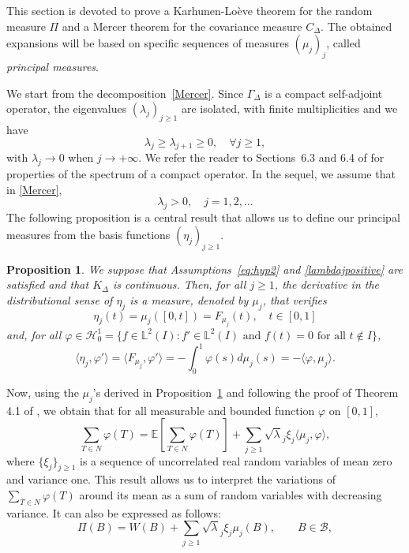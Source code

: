 \documentclass[aos]{imsart}
\theoremstyle{plain}
\newtheorem{proposition}[theorem]{Proposition}%
\theoremstyle{remark}
\newcommand{\1}{1}
\begin{document}
This section is devoted to prove a Karhunen-Lo\`eve theorem for the random measure $\Pi$ and a Mercer theorem for the covariance measure $C_\Delta$. The obtained expansions will be based on specific sequences of measures $(\mu_j)_j$, called \textit{principal measures}. 

We start from the decomposition~\eqref{Mercer}. Since $\Gamma_\Delta$ is a compact self-adjoint operator, the eigenvalues $(\lambda_j)_{j\geq 1} $ are isolated, with finite multiplicities and we have
$$\lambda_{j}\geq \lambda_{j+1}\geq 0,\quad\forall j\geq 1,$$
with $\lambda_j\to 0$ when $j\to+\infty$. We refer the reader to Sections~6.3 and 6.4 of \cite{Brezis11} for properties of the spectrum of a compact operator. In the sequel, we assume that in \eqref{Mercer}, 
\begin{equation}\label{lambdajpositive}
\lambda_j>0,\quad j=1,2,\ldots
\end{equation}
The following proposition is a central result that allows us to define our principal measures from the basis functions $(\eta_j)_{j\geq 1}$. 
\begin{proposition}\label{prop:muj} We suppose that Assumptions~\eqref{eq:hyp2} and \eqref{lambdajpositive} are satisfied and that $K_\Delta$ is continuous. Then, for all $j\geq 1$, the derivative in the distributional sense of $\eta_j$ is a measure, denoted by $\mu_j$, that verifies
\[
\eta_j(t)=\mu_j([0,t])=F_{\mu_j}(t),\quad t\in[0,1]
\]
and, for all  $\varphi\in\mathcal H_0^1=\Big\{f\in \mathbb L^2(I):f'\in \mathbb L^2(I) \text{ and }f(t) = 0 \text{ for all } t\notin I \Big\}$, 
\begin{equation}\label{phimu*}
\langle\eta_j,\varphi'\rangle =\langle F_{\mu_j},\varphi'\rangle =-\int_0^1\varphi(s)d\mu_j(s)=-\langle \varphi,\mu_j\rangle. 
\end{equation}
\end{proposition}
Now, using the $\mu_j$'s derived in Proposition~\ref{prop:muj} and following the proof of  Theorem 4.1 of \cite{Carrizo22},  we obtain that for all measurable and bounded function $\varphi$ on $[0,1]$, 
\[
\sum_{T\in N}\varphi(T)= \mathbb E\left[\sum_{T\in N}\varphi(T)\right]+\sum_{j\geq 1}\sqrt\lambda_j\xi_j\langle\mu_j,\varphi\rangle,
\]
where $\{\xi_j\}_{j\geq 1}$ is a sequence of uncorrelated real random variables of mean zero and variance one.
This result allows us to interpret the variations of $\sum_{T\in N}\varphi(T)$ around its mean as a sum of random variables with decreasing variance. It can also be expressed as follows: 
\begin{equation}\label{eq:KL}
\Pi(B)  = W(B) + \sum_{j\geq 1}\sqrt\lambda_j\xi_j\mu_j(B), \qquad B\in\mathcal B, 
\end{equation}
\end{document}
